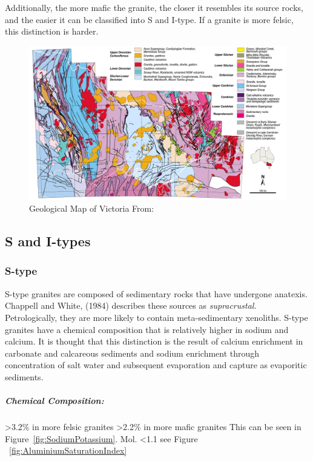 \documentclass[a4paper]{article}
\begin{document}
Additionally, the more mafic the granite, the closer it resembles its source rocks, and the easier it can be classified into S and I-type. If a granite is more felsic, this distinction is harder.   


\begin{figure}[H]
\centering
\includegraphics[width=1\textwidth]{vicmaprocktypes.jpg}
\caption{\label{fig:VicMapRockTypes}Geological Map of Victoria From: \cite{vandenberg2000tasman}}
\end{figure}

\subsection{S and I-types}

\subsubsection{S-type}
S-type granites are composed of sedimentary rocks that have undergone anatexis. Chappell and White, (1984) describes these sources as \textit{supracrustal}.
Petrologically, they are more likely to contain meta-sedimentary xenoliths. S-type granites have a chemical composition that is relatively higher in sodium and calcium. It is thought that this distinction is the result of calcium enrichment in carbonate and calcareous sediments and sodium enrichment through concentration of salt water and subsequent evaporation and capture as evaporitic sediments. 

\subparagraph{Chemical Composition:}

 \textgreater 3.2\% in more felsic granites\newline
{} \textgreater 2.2\% in more mafic granites\newline
This can be seen in Figure~\ref{fig:SodiumPotassium}.\newline\newline
Mol.  \textless 1.1 see Figure  ~\ref{fig:AluminiumSaturationIndex} \newline
\end{document}
